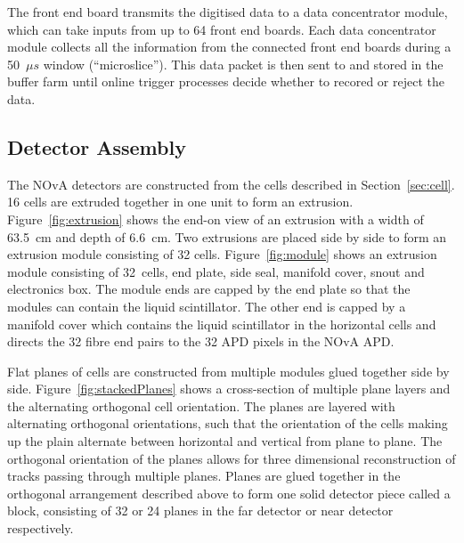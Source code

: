 The front end board transmits the digitised data to a data
concentrator module, which can take inputs from up to 64 front end
boards. 
Each data concentrator module collects all the information from the connected front end boards during a
50~$\mu s$ window (``microslice''). 
This data packet is then sent to and stored in the buffer farm
until online trigger processes decide whether to recored or reject the
data. 


\subsection{Detector Assembly} \label{sec:detAssembly}

The NOvA detectors are constructed from the cells described
in Section~\ref{sec:cell}. 16 cells are extruded together in one unit
to form an extrusion.
Figure~\ref{fig:extrusion} shows the end-on view of an extrusion with
a width of 63.5~cm and depth of 6.6~cm. 
Two extrusions are placed side by side to form an extrusion module
consisting of 32 cells.
Figure~\ref{fig:module} shows an extrusion module consisting of
32~cells, end plate, side seal, manifold cover, snout and
electronics box.
The
module ends are capped by the end plate so that the modules can
contain the liquid scintillator. The other end is capped by a manifold
cover which contains the liquid scintillator in the horizontal cells
and directs the 32 fibre end pairs to the 32 APD pixels in the NOvA
APD. 

Flat planes of cells are constructed from multiple modules glued
together side by side. 
Figure~\ref{fig:stackedPlanes} shows a cross-section of multiple plane
layers and the alternating orthogonal cell orientation.
The planes are layered with alternating orthogonal
orientations, such that the orientation of the cells making up the
plain alternate between horizontal and vertical from plane to
plane. The orthogonal 
orientation of the planes allows for three dimensional reconstruction
of tracks passing through multiple planes. Planes are glued together
in the orthogonal arrangement described above to form one solid
detector piece called a block, consisting of 32 or 24 planes in the
far detector or near detector respectively.


